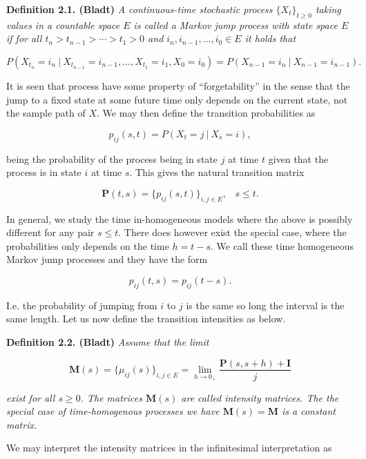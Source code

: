\documentclass[a4paper,12pt,openany]{book}
\begin{document}
\textbf{Definition 2.1. (Bladt)} \emph{A continuous-time stochastic process \(\{X_t\}_{t\ge 0}\) taking values in a countable space \(E\) is called a Markov jump process with state space \(E\) if for all \(t_n>t_{n-1}>\cdots > t_1>0\) and \(i_n,i_{n-1},...,i_0\in E\) it holds that}

\[
P(X_{t_n}=i_n \ \vert\ X_{t_{n-1}}=i_{n-1},...,X_{t_1}=i_1,X_0=i_0)=P(X_{n-1}=i_n\ \vert\ X_{n-1}=i_{n-1}).
\]

It is seen that process have some property of ``forgetability'' in the sense that the jump to a fixed state at some future time only depends on the current state, not the sample path of \(X\). We may then define the transition probabilities as

\[
p_{ij}(s,t)=P(X_t=j\ \vert\ X_s=i),
\]

being the probability of the process being in state \(j\) at time \(t\) given that the process is in state \(i\) at time \(s\). This gives the natural transition matrix

\[
\mathbf{P}(t,s)=\big\{p_{ij}(s,t)\big\}_{i,j\in E},\hspace{10pt} s\le t.
\]

In general, we study the time in-homogeneous models where the above is possibly different for any pair \(s\le t\). There does however exist the special case, where the probabilities only depends on the time \(h=t-s\). We call these time homogeneous Markov jump processes and they have the form

\[
p_{ij}(t,s)=p_{ij}(t-s).
\]

I.e. the probability of jumping from \(i\) to \(j\) is the same so long the interval is the same length. Let us now define the transition intensities as below.

\textbf{Definition 2.2. (Bladt)} \emph{Assume that the limit}

\[
\mathbf{M}(s)=\big\{\mu_{ij}(s)\big\}_{i,j\in E}=\lim_{h\to 0_+}\frac{\mathbf{P}(s,s+h)+\mathbf{I}}{j}
\]

\emph{exist for all \(s\ge 0\). The matrices \(\mathbf{M}(s)\) are called intensity matrices. The the special case of time-homogenous processes we have \(\mathbf{M}(s)=\mathbf{M}\) is a constant matrix. }

We may interpret the intensity matrices in the infinitesimal interpretation as
\end{document}
